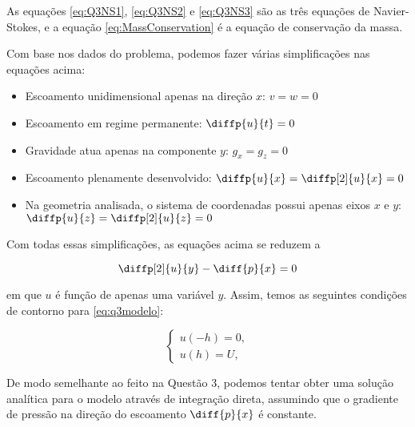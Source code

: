 As equações \eqref{eq:Q3NS1}, \eqref{eq:Q3NS2} e \eqref{eq:Q3NS3} são as três 
equações de Navier-Stokes, e a equação \eqref{eq:MassConservation} é a equação de conservação
da massa.

Com base nos dados do problema, podemos fazer várias simplificações nas equações acima:

\begin{itemize}
    \item Escoamento unidimensional apenas na direção $x$: $v = w = 0$
    \item Escoamento em regime permanente: $\diffp{u}{t} = 0$
    \item Gravidade atua apenas na componente $y$: $g_x = g_z = 0$
    \item Escoamento plenamente desenvolvido: $\diffp{u}{x} = \diffp[2]{u}{x} = 0$
    \item Na geometria analisada, o sistema de coordenadas possui apenas eixos $x$ e $y$: 
    $\diffp{u}{z} = \diffp[2]{u}{z} = 0$ 
\end{itemize}

Com todas essas simplificações, as equações acima se reduzem a 

\begin{equation}\label{eq:q3modelo}
    \diffp[2]{u}{y} - \diff{p}{x} = 0
\end{equation}

\noindent em que $u$ é função de apenas uma variável $y$.
Assim, temos as seguintes condições de contorno para \eqref{eq:q3modelo}:

\begin{equation}\label{eq:q3modeloContorno}
    \begin{cases}
        u(-h) = 0, \\
        u(h) = U,   
    \end{cases}
\end{equation}

De modo semelhante ao feito na Questão 3, podemos tentar obter uma solução analítica
para o modelo através de integração direta, assumindo que o gradiente de pressão 
na direção do escoamento $\diff{p}{x}$ é constante.